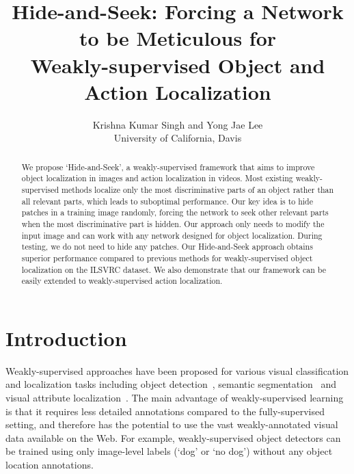\documentclass[10pt,twocolumn,letterpaper]{article}
\begin{document}
\title{Hide-and-Seek: Forcing a Network to be Meticulous for\\Weakly-supervised Object and Action Localization}


\author{Krishna Kumar Singh and Yong Jae Lee\\
	University of California, Davis}

\maketitle


\begin{abstract}
\vspace*{-0.1in}
We propose `Hide-and-Seek', a weakly-supervised framework that aims to improve object localization in images and action localization in videos.  Most existing weakly-supervised methods localize only the most discriminative parts of an object rather than all relevant parts, which leads to suboptimal performance. Our key idea is to hide patches in a training image randomly, forcing the network to seek other relevant parts when the most discriminative part is hidden. Our approach only needs to modify the input image and can work with any network designed for object localization.  During testing, we do not need to hide any patches.  Our Hide-and-Seek approach obtains superior performance compared to previous methods for weakly-supervised object localization on the ILSVRC dataset.  We also demonstrate that our framework can be easily extended to weakly-supervised action localization.
\end{abstract}

\vspace*{-0.1in}\section{Introduction}\vspace*{-0.05in}

Weakly-supervised approaches have been proposed for various visual classification and localization tasks including object detection~\cite{weber-eccv2000,fergus-cvpr2003,Crandall-ECCV2006,siva-eccv2012,bilen-bmcv2014,wang-eccv2014,song-nips2014,cinbis-arxiv2015,Oquab-cvpr15,zhou-cvpr2016,krishna-cvpr2016}, semantic segmentation~\cite{pathak-ICCV2015,khoreva-cvpr2016} and visual attribute localization~\cite{berg-eccv2010,wang-cvpr2013b,Xiao-iccv2015,Wang-CVPR2016,krishna-eccv2016}.  The main advantage of weakly-supervised learning is that it requires less detailed annotations compared to the fully-supervised setting, and therefore has the potential to use the vast weakly-annotated visual data available on the Web.  For example, weakly-supervised object detectors can be trained using only image-level labels (`dog' or `no dog') without any object location annotations.
\end{document}
